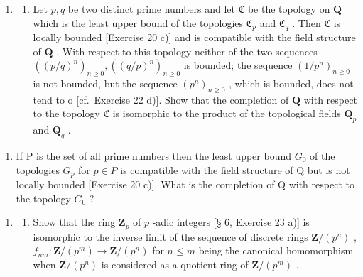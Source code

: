 \begin{enumerate}
\def\labelenumi{\arabic{enumi})}
\setcounter{enumi}{25}
\tightlist
\item
  \begin{enumerate}
  \def\labelenumii{\alph{enumii})}
  \tightlist
  \item
    Let \(p, q\) be two distinct prime numbers and let \(\mathfrak{C}\) be the topology on \(\mathbf{Q}\) which is the least upper bound of the topologies \(\mathfrak{C}_p\) and \(\mathfrak{C}_q\) . Then \(\mathfrak{C}\) is locally bounded {[}Exercise 20 c){]} and is compatible with the field structure of \(\mathbf{Q}\) . With respect to this topology neither of the two sequences \(((p/q)^n)_{n\geqslant 0}, ((q/p)^n)_{n\geqslant 0}\) is bounded; the sequence \((1/p^n)_{n\geqslant 0}\) is not bounded, but the sequence \((p^n)_{n\geqslant 0}\) , which is bounded, does not tend to o {[}cf.~Exercise 22 d){]}. Show that the completion of \(\mathbf{Q}\) with respect to the topology \(\mathfrak{C}\) is isomorphic to the product of the topological fields \(\mathbf{Q}_p\) and \(\mathbf{Q}_q\) .
  \end{enumerate}
\end{enumerate}

\begin{enumerate}
\def\labelenumi{\alph{enumi})}
\setcounter{enumi}{1}
\tightlist
\item
  If P is the set of all prime numbers then the least upper bound \(G_{0}\) of the topologies \(G_{p}\) for \(p \in P\) is compatible with the field structure of Q but is not locally bounded {[}Exercise 20 c){]}. What is the completion of Q with respect to the topology \(G_{0}\) ?
\end{enumerate}

\BourbakiExerciseGroup

\begin{enumerate}
\def\labelenumi{\arabic{enumi})}
\tightlist
\item
  \begin{enumerate}
  \def\labelenumii{\alph{enumii})}
  \tightlist
  \item
    Show that the ring \(\mathbf{Z}_p\) of \(p\) -adic integers {[}§ 6, Exercise 23 a){]} is isomorphic to the inverse limit of the sequence of discrete rings \(\mathbf{Z}/(p^n)\) , \(f_{nm}: \mathbf{Z}/(p^m) \to \mathbf{Z}/(p^n)\) for \(n \leqslant m\) being the canonical homomorphism when \(\mathbf{Z}/(p^n)\) is considered as a quotient ring of \(\mathbf{Z}/(p^m)\) .
  \end{enumerate}
\end{enumerate}

